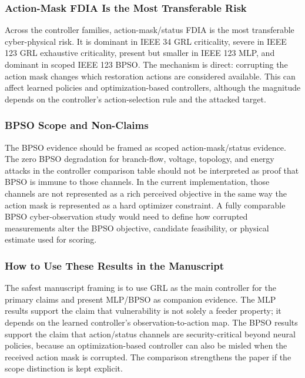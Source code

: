 \subsubsection{Action-Mask FDIA Is the Most Transferable Risk}
\label{subsubsec:action_mask_transferability}

Across the controller families, action-mask/status FDIA is the most transferable cyber-physical risk. It is dominant in IEEE 34 GRL criticality, severe in IEEE 123 GRL exhaustive criticality, present but smaller in IEEE 123 MLP, and dominant in scoped IEEE 123 BPSO. The mechanism is direct: corrupting the action mask changes which restoration actions are considered available. This can affect learned policies and optimization-based controllers, although the magnitude depends on the controller's action-selection rule and the attacked target.

\subsubsection{BPSO Scope and Non-Claims}
\label{subsubsec:bpso_scope_nonclaims}

The BPSO evidence should be framed as scoped action-mask/status evidence. The zero BPSO degradation for branch-flow, voltage, topology, and energy attacks in the controller comparison table should not be interpreted as proof that BPSO is immune to those channels. In the current implementation, those channels are not represented as a rich perceived objective in the same way the action mask is represented as a hard optimizer constraint. A fully comparable BPSO cyber-observation study would need to define how corrupted measurements alter the BPSO objective, candidate feasibility, or physical estimate used for scoring.

\subsubsection{How to Use These Results in the Manuscript}
\label{subsubsec:companion_results_usage}

The safest manuscript framing is to use GRL as the main controller for the primary claims and present MLP/BPSO as companion evidence. The MLP results support the claim that vulnerability is not solely a feeder property; it depends on the learned controller's observation-to-action map. The BPSO results support the claim that action/status channels are security-critical beyond neural policies, because an optimization-based controller can also be misled when the received action mask is corrupted. The comparison strengthens the paper if the scope distinction is kept explicit.

